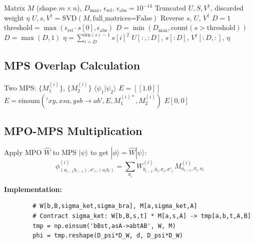 \documentclass[aps,prb,onecolumn,scriptaddress]{revtex4-2}
\newcommand{\eps}{\epsilon}
\newcommand{\braket}[2]{\langle#1|#2\rangle}
\begin{document}
	\begin{algorithm}[H]
		\caption{TruncateBond}
		\begin{algorithmic}[1]
			\Require Matrix $M$ (shape $m \times n$), $D_{\max}$, $\eps_{\text{rel}}$, $\eps_{\text{abs}} = 10^{-14}$
			\Ensure Truncated $U, S, V^\dagger$, discarded weight $\eta$
			\State $U, s, V^\dagger = \text{SVD}(M, \text{full\_matrices=False})$
			\State Reverse $s$, $U$, $V^\dagger$
			\EndIf
			\If{$s[0] < \eps_{\text{abs}}$}
			\State $D = 1$
			\Else
			\State $\text{threshold} = \max(\eps_{\text{rel}} \cdot s[0], \eps_{\text{abs}})$
			\State $D = \min(D_{\max}, \text{count}(s > \text{threshold}))$
			\State $D = \max(D, 1)$
			\EndIf
			\State $\eta = \sum_{i=D}^{\text{len}(s)-1} s[i]^2$
			\State \Return $U[:, :D]$, $s[:D]$, $V^\dagger[:D, :]$, $\eta$
		\end{algorithmic}
	\end{algorithm}
	
	\subsection{MPS Overlap Calculation}
	
	\begin{algorithm}[H]
		\caption{ComputeOverlap}
		\begin{algorithmic}[1]
			\Require Two MPS: $\{M_1^{(i)}\}$, $\{M_2^{(i)}\}$
			\Ensure $\braket{\psi_1}{\psi_2}$
			\State $E = [[1.0]]$
			\State $E = \text{einsum}('xy,xsa,ysb \to ab', E, M_1^{(i)*}, M_2^{(i)})$
			\EndFor
			\State \Return $E[0, 0]$
		\end{algorithmic}
	\end{algorithm}
	
	\subsection{MPO-MPS Multiplication}
	
	Apply MPO $\hat{W}$ to MPS $|\psi\rangle$ to get $|\phi\rangle = \hat{W}|\psi\rangle$:
	\begin{equation}
		\phi^{(i)}_{(a_{i-1} b_{i-1}), \sigma'_i, (a_i b_i)} = \sum_{\sigma_i} W^{(i)}_{b_{i-1}, b_i, \sigma_i, \sigma'_i} \, M^{(i)}_{a_{i-1}, \sigma_i, a_i}
	\end{equation}
	
	\textbf{Implementation:}
	\begin{verbatim}
		# W[b,B,sigma_ket,sigma_bra], M[a,sigma_ket,A]
		# Contract sigma_ket: W[b,B,s,t] * M[a,s,A] -> tmp[a,b,t,A,B]
		tmp = np.einsum('bBst,asA->abtAB', W, M)
		phi = tmp.reshape(D_psi*D_W, d, D_psi*D_W)
	\end{verbatim}
	
\end{document}
